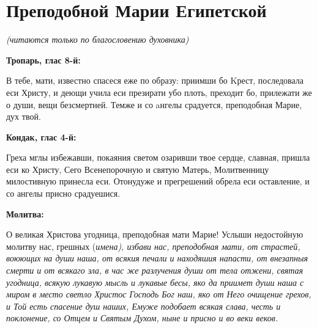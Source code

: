 


 


 

\section{Преподобной Марии Египетской}
 


\itshape (читаются только по благословению духовника)\normalfont{}


\medskip


\bfseries Тропарь, глас 8-й:\normalfont{}


В тебе, мати, известно спасеся еже по образу: приимши бо Kрест, последовала еси Христу, и деющи учила еси презирати убо плоть, преходит бо, прилежати же о души, вещи безсмертней. Темже и со aнгелы срадуется, преподобная Марие, дух твой.


\medskip


\bfseries Кондак, глас 4-й:\normalfont{}


Греха мглы избежавши, покаяния светом озаривши твое сердце, славная, пришла еси ко Христу, Сего Всенепорочную и святую Матерь, Молитвенницу милостивную принесла еси. Отонудуже и прегрешений обрела еси оставление, и со ангелы присно срадуешися.


\medskip


\bfseries Молитва:\normalfont{}


О великая Христова угодница, преподобная мати Марие! Услыши недостойную молитву нас, грешных (\itshape имена\normalfont{}), избави нас, преподобная мати, от страстей, воюющих на души наша, от всякия печали и находяшия напасти, от внезапныя смерти и от всякаго зла, в час же разлучения души от тела отжени, святая угодница, всякую лукавую мысль и лукавые бесы, яко да приимет души наша с миром в место светло Христос Господь Бог наш, яко от Него очищение грехов, и Той есть спасение душ наших, Емуже подобает всякая слава, честь и поклонение, со Отцем и Святым Духом, ныне и присно и во веки веков.


